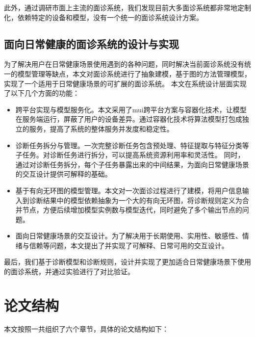 此外，通过调研市面上主流的面诊系统，我们发现目前大多面诊系统都非常地定制化，依赖特定的设备和模型，没有一个统一的面诊系统设计方案。


\subsection{面向日常健康的面诊系统的设计与实现}

为了解决用户在日常健康场景使用遇到的各种问题，同时解决当前面诊系统没有统一的模型管理等缺点，本文对面诊系统进行了抽象建模，基于图的方法管理模型，实现了一个适用于日常健康场景的可扩展的面诊系统。
本文在系统设计层面实现了以下几个方面的功能：

\begin{itemize}

    \item 跨平台实现与模型服务化。本文采用了mui跨平台方案与容器化技术，让模型在服务端运行，屏蔽了用户的设备差异。通过容器化技术将算法模型打包成独立的服务，提高了系统的整体服务并发度和稳定性。

    \item 诊断任务拆分与管理。一次完整诊断任务包含预处理、特征提取与特征分类等子任务。对诊断任务进行拆分，可以提高系统资源利用率和灵活性。
    同时，通过对诊断任务拆分，每个子任务暴露出来的中间结果，为面向日常健康场景的交互设计提供可解释的基础。
    
    \item 基于有向无环图的模型管理。本文对一次面诊过程进行了建模，将用户信息输入到诊断结果中的模型依赖抽象为一个大的有向无环图，将诊断规则定义为合并节点，方便后续增加模型实例数与模型迭代，同时避免了多个输出节点的问题。
    
    \item 面向日常健康场景的交互设计。为了解决用于长期使用、实用性、敏感性、情绪与信赖等问题，本文提出了并实现了可解释、日常可用的交互设计。

\end{itemize}

最后，我们基于诊断模型和诊断规则，设计并实现了更加适合日常健康场景下使用的面诊系统，并通过实验进行了对比验证。

\section{论文结构}
本文按照一共组织了六个章节，具体的论文结构如下：

